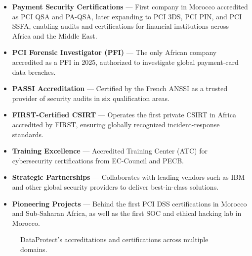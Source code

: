 \documentclass[12pt]{article}
\begin{document}
\begin{itemize}
    \item \textbf{Payment Security Certifications} --- First company in Morocco accredited as PCI QSA and PA-QSA, later expanding to PCI 3DS, PCI PIN, and PCI SSFA, enabling audits and certifications for financial institutions across Africa and the Middle East.
    \item \textbf{PCI Forensic Investigator (PFI)} --- The only African company accredited as a PFI in 2025, authorized to investigate global payment-card data breaches.
    \item \textbf{PASSI Accreditation} --- Certified by the French ANSSI as a trusted provider of security audits in six qualification areas.
    \item \textbf{FIRST-Certified CSIRT} --- Operates the first private CSIRT in Africa accredited by FIRST, ensuring globally recognized incident-response standards.
    \item \textbf{Training Excellence} --- Accredited Training Center (ATC) for cybersecurity certifications from EC-Council and PECB.
    \item \textbf{Strategic Partnerships} --- Collaborates with leading vendors such as IBM and other global security providers to deliver best-in-class solutions.
    \item \textbf{Pioneering Projects} --- Behind the first PCI DSS certifications in Morocco and Sub-Saharan Africa, as well as the first SOC and ethical hacking lab in Morocco.
\end{itemize}

\begin{figure}[ht]
\centering
{}
\caption{DataProtect's accreditations and certifications across multiple domains.}
\label{fig:dataprotect-accreditations}
\end{figure}
\end{document}
